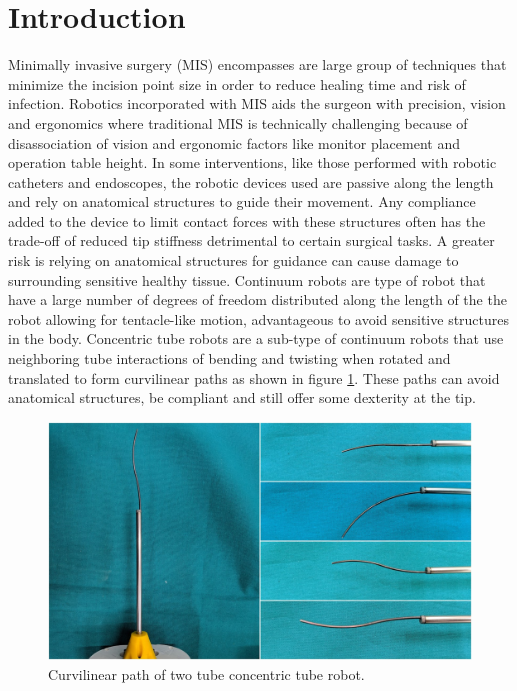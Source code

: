 \section{Introduction}
\label{intro}
Minimally invasive surgery (MIS) encompasses are large group of techniques that minimize the incision point size in order to reduce healing time and risk of infection. Robotics incorporated with MIS aids the surgeon with precision, vision and ergonomics where traditional MIS is technically challenging because of disassociation of vision and ergonomic factors like monitor placement and operation table height. In some interventions, like those performed with robotic catheters and endoscopes, the robotic devices used are passive along the length and rely on anatomical structures to guide their movement. Any compliance added to the device to limit contact forces with these structures often has the trade-off of reduced tip stiffness detrimental to certain surgical tasks. A greater risk is relying on anatomical structures for guidance can cause damage to surrounding sensitive healthy tissue. Continuum robots are type of robot that have a large number of degrees of freedom distributed along the length of the the robot allowing for tentacle-like motion, advantageous to avoid sensitive structures in the body. Concentric tube robots are a sub-type of continuum robots that use neighboring tube interactions of bending and twisting when rotated and translated to form curvilinear paths as shown in figure \ref{fig:curvilinear-paths}. These paths can avoid anatomical structures, be compliant and still offer some dexterity at the tip.
\begin{figure}
  \includegraphics[width=\linewidth]{images/ctr-collage.jpg}
\caption{Curvilinear path of two tube concentric tube robot.}
\label{fig:curvilinear-paths}
\end{figure}

